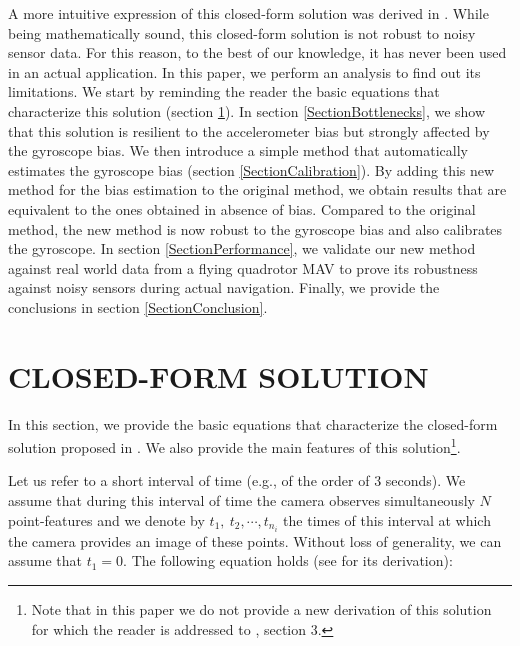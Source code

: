 \documentclass[letterpaper, 10 pt, journal, final]{ieeeconf}  %
\begin{document}
A more intuitive expression of this closed-form solution was derived in \cite{Martinelli2014}.
While being mathematically sound, this closed-form solution is not robust to noisy sensor data.
For this reason, to the best of our knowledge, it has never been used in an actual application.
In this paper, we perform an analysis to find out its limitations. We start by reminding the reader the basic equations that characterize this solution (section \ref{SectionCFS}).
In section \ref{SectionBottlenecks}, we show that this solution is resilient to the accelerometer bias but strongly affected by the gyroscope bias.
We then introduce a simple method that automatically estimates the gyroscope bias (section \ref{SectionCalibration}).
By adding this new method for the bias estimation to the original method, we obtain results that are equivalent to the ones obtained in absence of bias.
Compared to the original method, the new method is now robust to the gyroscope bias and also calibrates the gyroscope.
In section \ref{SectionPerformance}, we validate our new method against real world data from a flying quadrotor MAV to prove its robustness against noisy sensors during actual navigation.
Finally, we provide the conclusions in section \ref{SectionConclusion}.

\section{CLOSED-FORM SOLUTION}\label{SectionCFS}

In this section, we provide the basic equations that characterize the closed-form solution proposed in  \cite{Martinelli2014}. We also provide the main features of this solution\footnote{Note that in this paper we do not provide a new derivation of this solution for which the reader is addressed to \cite{Martinelli2014}, section 3.}.

Let us refer to a short interval of time (e.g., of the order of $3$ seconds). We assume that during this interval of time the camera observes simultaneously $N$ point-features and we denote by $t_1,~t_2,\cdots,t_{n_i}$ the times of this interval at which the camera provides an image of these points. Without loss of generality, we can assume that $t_1=0$.
The following equation holds (see \cite{Martinelli2014} for its derivation):
\end{document}

